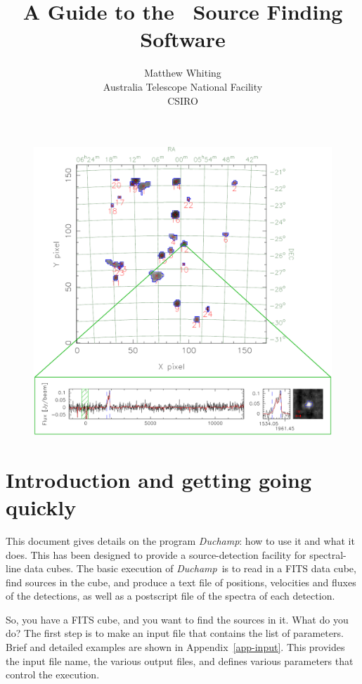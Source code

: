 \documentclass[12pt,a4paper]{article}
\title{A Guide to the \duchamp\ Source Finding Software}
\author{Matthew Whiting\\
Australia Telescope National Facility\\CSIRO}
\date{}
\newcommand{\duchamp}{\emph{Duchamp}}
\begin{document}
\maketitle
\thispagestyle{empty}
\begin{figure}[!h]
\begin{center}
\includegraphics[width=\textwidth]{cover_image}
\end{center}
\end{figure}

\newpage
\tableofcontents

\newpage
\section{Introduction and getting going quickly}

This document gives details on the program \duchamp: how to use it and
what it does. This has been designed to provide a source-detection
facility for spectral-line data cubes. The basic execution of
\duchamp\ is to read in a FITS data cube, find sources in the cube,
and produce a text file of positions, velocities and fluxes of the
detections, as well as a postscript file of the spectra of each
detection.

So, you have a FITS cube, and you want to find the sources in it. What
do you do? The first step is to make an input file that contains the
list of parameters. Brief and detailed examples are shown in
Appendix~\ref{app-input}. This provides the input file name, the various
output files, and defines various parameters that control the
execution.
\end{document}
